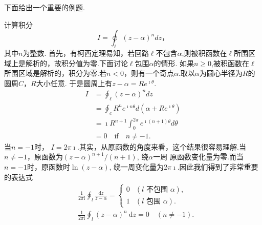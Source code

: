 下面给出一个重要的例题.
\begin{examplebox}{计算积分\[ I = \oint_\ell (z-\alpha)^n dz， \]其中$n$为整数.}
首先，有柯西定理易知，若回路$\ell$不包含$\alpha$,则被积函数在$\ell$所围区域上是解析的，故积分值为零.下面讨论$\ell$包围$\alpha$的情形.
如果$n\geq 0$,被积函数在$\ell$所围区域是解析的，积分为零.若$n<0$，则有一个奇点$\alpha$.取以$\alpha$为圆心半径为$R$的圆周$C$，$R$大小任意.
于是圆周上有$z-\alpha = Re^{\imath \theta}$.
\begin{equation}
\begin{aligned}
    I &= \oint_\ell (z-\alpha)^n dz\\
     &= \oint_c R^n e^{\imath n \theta} d (\alpha + R e^{\imath \theta})\\
     & =  \imath R^{n+1} \int_0^{2\pi} e^{\imath (n+1)\theta}  d\theta \\
     & = 0 \quad \textrm{if} \quad n\neq -1.
\end{aligned}
\end{equation}
当$n = -1$时， $I = 2\pi \imath$.其实，从原函数的角度来看，这个结果很容易理解.当$n\neq -1$，原函数为$(z-\alpha)^{n+1}/(n+1)$, 绕$\alpha$一周
原函数变化量为零.而当$n=-1$时，原函数时$\ln(z-\alpha)$, 绕一周变化量为$2\pi \imath$.因此我们得到了非常重要的表达式
\begin{equation}
    \begin{aligned}
        & \frac{1}{2 \pi \mathrm{i}} \oint_l \frac{\mathrm{d} z}{z-\alpha}= \begin{cases}0 & (l \text { 不包围 } \alpha), \\
        1 & (l \text { 包围 } \alpha) . \end{cases} \\
        & \frac{1}{2 \pi \mathrm{i}} \oint_l(z-\alpha)^n \mathrm{~d} z=0 \quad(n \neq-1) .
        \end{aligned}
\end{equation}
\end{examplebox}